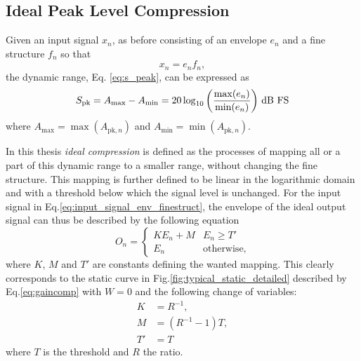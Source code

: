 \documentclass[../main2.tex]{subfiles}
\begin{document}
\FloatBarrier
\subsection{Ideal Peak Level Compression}\label{method_ideal_peak_compression}
Given an input signal $x_n$, as before consisting of an envelope $e_n$ and a fine structure $f_n$ so that
\begin{equation}\label{eq:input_signal_env_finestruct}
x_n = e_n f_n,
\end{equation}
the dynamic range, Eq. \eqref{eq:s_peak}, can be expressed as
\begin{equation}
S_\text{pk} =A_\text{max} - A_\text{min} = 20 \log_{10} \left(\frac{\max(e_n)}{\min(e_n)}\right) \mskip3mu\text{dB FS}
\end{equation}
where $A_\text{max} = \max(A_{\text{pk},n})$ and $A_\text{min} =  \min(A_{\text{pk},n})$.
 
In this thesis \emph{ideal compression} is defined as the processes of mapping all or a part of this dynamic range to a smaller range, without changing the fine structure. This mapping is further defined to be linear in the logarithmic domain and with a threshold below which the signal level is unchanged. For the input signal in Eq.\eqref{eq:input_signal_env_finestruct}, the envelope of the ideal output signal can thus be described by the following equation
\begin{equation}\label{eq:dynamic_range_mapping}
O_n =
\begin{cases}
	K E_n + M 					& E_n \geq T'  \\
	E_n							& \text{otherwise},
\end{cases} 
\end{equation}\label{eq:ideal_output_envelope}
where $K$, $M$ and $T'$ are constants defining the wanted mapping. This clearly corresponds to the static curve in Fig.\ref{fig:typical_static_detailed} described by Eq.\eqref{eq:gaincomp} with $W=0$ and the following change of variables:
\begin{equation}
\begin{split}
K &= R^{-1}, \\
M &= (R^{-1}-1)T,\\
T' &= T
\end{split}
\end{equation}
where $T$ is the threshold and $R$ the ratio.
\end{document}
